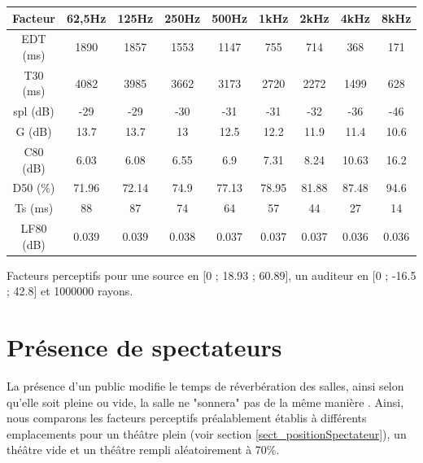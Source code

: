 \begin{tableth} 
 \begin{tabular}{| *{9}{c|}} 
 \hline 
 Facteur & 62,5Hz & 125Hz & 250Hz & 500Hz & 1kHz & 2kHz & 4kHz & 8kHz \\ 
 \hline 
 \hline 
\gls{EDT} (ms)& 1890& 1857& 1553& 1147& 755& 714& 368& 171 \\ 
 \hline 
\gls{T30} (ms)& 4082& 3985& 3662& 3173& 2720& 2272& 1499& 628 \\ 
 \hline 
\gls{spl} (dB)& -29& -29& -30& -31& -31& -32& -36& -46 \\ 
 \hline 
\gls{G} (dB)& 13.7& 13.7& 13& 12.5& 12.2& 11.9& 11.4& 10.6 \\ 
 \hline 
\gls{C80} (dB)& 6.03& 6.08& 6.55& 6.9& 7.31& 8.24& 10.63& 16.2 \\ 
 \hline 
\gls{D50} (\%)& 71.96& 72.14& 74.9& 77.13& 78.95& 81.88& 87.48& 94.6 \\ 
 \hline 
\gls{Ts} (ms)& 88& 87& 74& 64& 57& 44& 27& 14 \\ 
 \hline 
\gls{LF80} (dB)& 0.039& 0.039& 0.038& 0.037& 0.037& 0.037& 0.036& 0.036 \\ 
 \hline 
\end{tabular} 
 \caption{Facteurs perceptifs pour une source en [0 ; 18.93 ; 60.89], un auditeur en [0 ; -16.5 ; 42.8] et 1000000 rayons.} 
 \label{tab_niche} 
 \end{tableth}




\section{Présence de spectateurs}
La présence d'un public modifie le temps de réverbération des salles, ainsi selon qu'elle soit pleine ou vide, la salle ne "sonnera" pas de la même manière \cite[p.212]{jouhaneau}. Ainsi, nous comparons les facteurs perceptifs préalablement établis à différents emplacements pour un théâtre plein (voir section \ref{sect_positionSpectateur}), un théâtre vide et un théâtre rempli aléatoirement à 70\%.



